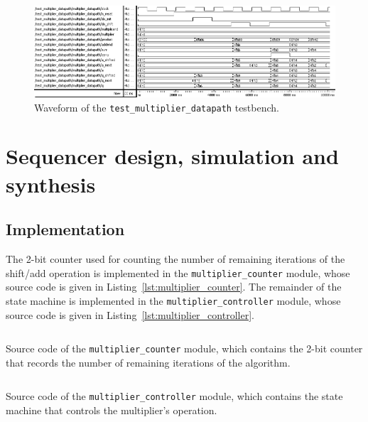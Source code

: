 \documentclass[a4paper]{article}
\begin{document}
\begin{figure}[ht]
  \centering\includegraphics[width=\textwidth]{assets/test_multiplier_datapath}
  \centering\caption{Waveform of the \texttt{test\_multiplier\_datapath} testbench.}
  \label{fig:test_multiplier_datapath}
\end{figure}

\section{Sequencer design, simulation and synthesis}
\label{sec:seq}


\subsection{Implementation}
\label{sec:seq:impl}

The 2-bit counter used for counting the number of remaining iterations of the shift/add operation is implemented in the \texttt{multiplier\_counter} module, whose source code is given in Listing~\ref{lst:multiplier_counter}. The remainder of the state machine is implemented in the \texttt{multiplier\_controller} module, whose source code is given in Listing~\ref{lst:multiplier_controller}.

\begin{listing}[ht]
  \inputminted{systemverilog}{../src/multiplier/multiplier_counter.sv}
  \centering\caption{Source code of the \texttt{multiplier\_counter} module, which contains the 2-bit counter that records the number of remaining iterations of the algorithm.}
  \label{lst:multiplier_counter}
\end{listing}

\begin{listing}[ht]
  \inputminted{systemverilog}{../src/multiplier/multiplier_controller.sv}
  \centering\caption{Source code of the \texttt{multiplier\_controller} module, which contains the state machine that controls the multiplier's operation.}
  \label{lst:multiplier_controller}
\end{listing}
\end{document}
